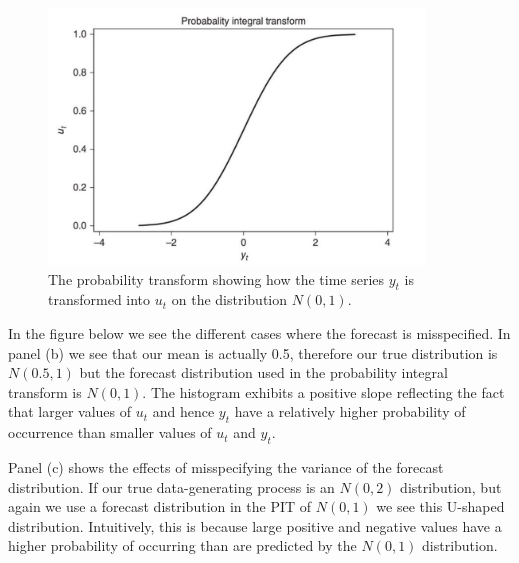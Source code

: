 \documentclass[11pt]{article}
\begin{document}
\begin{figure}[h]
    \centering
    \includegraphics[width=10cm]{pics/probability integral transform.png}
    \caption{The probability transform showing how the time series $y_t$ is transformed into $u_t$ on the distribution $N(0,1)$.}
    \label{fig: PIT}
\end{figure}

In the figure below we see the different cases where the forecast is misspecified. In panel (b) we see that our mean is actually 0.5, therefore our true distribution is $N(0.5,1)$ but the forecast distribution used in the probability integral transform is $N(0,1)$. The histogram exhibits a positive slope reflecting the fact that larger values of $u_t$ and hence $y_t$ have a relatively higher probability of occurrence than smaller values of $u_t$ and $y_t$.

Panel (c) shows the effects of misspecifying the variance of the forecast distribution. If our true data-generating process is an $N(0,2)$ distribution, but again we use a forecast distribution in the PIT of $N(0,1)$ we see this U-shaped distribution. Intuitively, this is because large positive and negative values have a higher probability of occurring than are predicted by the $N(0,1)$ distribution.
\end{document}

